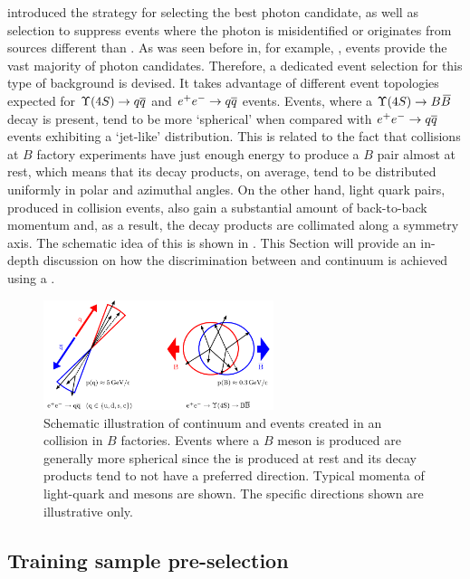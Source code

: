  introduced the strategy for selecting the best photon candidate, 
as well as selection to suppress events 
where the photon is misidentified or originates from sources different than \BtoXsgamma.
As was seen before in, for example, ,
\epem\ra\qqbar events provide the vast majority of photon candidates.
Therefore, a dedicated event selection for this type of background is devised.
It takes advantage of different event topologies expected for $\FourS\to\qqbar$ and $e^+e^-\rightarrow q\overline q$ events.
Events, where a $\FourS\to\BB$ decay is present, tend to be more `spherical' when compared with $e^+e^-\rightarrow q\overline q$ events exhibiting a `jet-like' distribution.
This is related to the fact that \epem collisions at $B$ factory experiments have just enough energy to produce a $B$ pair almost at rest, which means that its decay products, on average, tend to be distributed uniformly in polar and azimuthal angles.
On the other hand, light quark pairs, produced in \epem collision events, also gain a substantial amount of back-to-back momentum and, as a result, the decay products are collimated along a symmetry axis. 
The schematic idea of this is shown in .
This Section will provide an in-depth discussion on how the discrimination between \BtoXsgamma and continuum is achieved using a \BDT.

\begin{figure}[htbp!]
    \centering
    \includegraphics[width=0.6\textwidth]{figures/continuum_suppression/figure_continuum_suppression_event_shapes.pdf}
    \caption{\label{fig:continuum_schematic} Schematic illustration of continuum and \BB events created in an \epem collision in $B$ factories.
    Events where a $B$ meson is produced are generally more spherical since the \FourS is produced at rest and its decay products tend to not have a preferred direction.
    Typical momenta of light-quark and \BB mesons are shown.
    The specific directions shown are illustrative only. 
    }
\end{figure}

\subsection{Training sample pre-selection}\label{sec:preselection}

